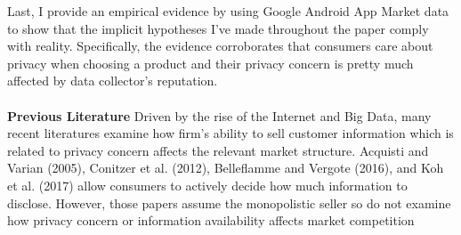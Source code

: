 \documentclass[12pt]{article}
\begin{document}
Last, I provide an empirical evidence by using Google Android App Market data to show that the implicit hypotheses I've made throughout the paper comply with reality. Specifically, the evidence corroborates that consumers care about privacy when choosing a product and their privacy concern is pretty much affected by data collector's reputation. 
\\\\
\textbf{Previous Literature} \quad 
Driven by the rise of the Internet and Big Data, many recent literatures examine how firm's ability to sell customer information which is related to privacy concern affects the relevant market structure. Acquisti and Varian (2005), Conitzer et al. (2012), Belleflamme and Vergote (2016), and Koh et al. (2017) allow consumers to actively decide how much information to disclose.  However, those papers assume the monopolistic seller so do not examine how privacy concern or information availability affects market competition

\end{document}
